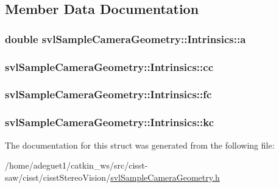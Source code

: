 \subsection{Member Data Documentation}
\hypertarget{structsvl_sample_camera_geometry_1_1_intrinsics_acc4d74ab02068cce2268ce6f622b2b78}{
\subsubsection[{a}]{\setlength{\rightskip}{0pt plus 5cm}double svl\-Sample\-Camera\-Geometry\-::\-Intrinsics\-::a}}\label{structsvl_sample_camera_geometry_1_1_intrinsics_acc4d74ab02068cce2268ce6f622b2b78}
\hypertarget{structsvl_sample_camera_geometry_1_1_intrinsics_a8389a02bf8568e620b28357cfe929fd4}{
\subsubsection[{cc}]{ svl\-Sample\-Camera\-Geometry\-::\-Intrinsics\-::cc}}\label{structsvl_sample_camera_geometry_1_1_intrinsics_a8389a02bf8568e620b28357cfe929fd4}
\hypertarget{structsvl_sample_camera_geometry_1_1_intrinsics_a695218668b61d9a523078479ffa9f336}{
\subsubsection[{fc}]{ svl\-Sample\-Camera\-Geometry\-::\-Intrinsics\-::fc}}\label{structsvl_sample_camera_geometry_1_1_intrinsics_a695218668b61d9a523078479ffa9f336}
\hypertarget{structsvl_sample_camera_geometry_1_1_intrinsics_a6c912ef66be611a6d9815e1910b27f4f}{
\subsubsection[{kc}]{ svl\-Sample\-Camera\-Geometry\-::\-Intrinsics\-::kc}}\label{structsvl_sample_camera_geometry_1_1_intrinsics_a6c912ef66be611a6d9815e1910b27f4f}


The documentation for this struct was generated from the following file\-:\begin{DoxyCompactItemize}
\item 
/home/adeguet1/catkin\-\_\-ws/src/cisst-\/saw/cisst/cisst\-Stereo\-Vision/\hyperlink{svl_sample_camera_geometry_8h}{svl\-Sample\-Camera\-Geometry.\-h}\end{DoxyCompactItemize}
